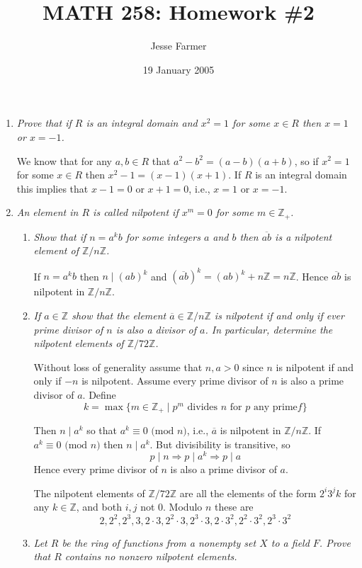 \documentclass[letterpaper, 11pt]{article}
\title{MATH 258: Homework \#2}
\author{Jesse Farmer}
\date{19 January 2005}
\newcommand{\Z}{\mathbb{Z}}
\begin{document}
\maketitle
\begin{enumerate}
\item \emph{Prove that if $R$ is an integral domain and $x^2 = 1$ for some $x \in R$ then $x=1$ or $x=-1$.}

We know that for any $a,b \in R$ that $a^2 - b^2 = (a-b)(a+b)$, so if $x^2 = 1$ for some $x \in R$ then $x^2 - 1 = (x-1)(x+1)$.  If $R$ is an integral domain this implies that $x-1 = 0$ or $x+1=0$, i.e., $x=1$ or $x = -1$.
 
\item \emph{An element in $R$ is called \emph{nilpotent} if $x^m = 0$ for some $m \in \Z_+$.}
\begin{enumerate}
\item \emph{Show that if $n=a^kb$ for some integers $a$ and $b$ then $\overline{ab}$ is a nilpotent element of $\Z/n\Z$.}

If $n=a^kb$ then $n \mid (ab)^k$ and $\left(\overline{ab}\right)^k = (ab)^k + n\Z = n\Z$.  Hence $\overline{ab}$ is nilpotent in $\Z/n\Z$.

\item \emph{If $a \in \Z$ show that the element $\overline{a} \in \Z/n\Z$ is nilpotent if and only if ever prime divisor of $n$ is also a divisor of $a$.  In particular, determine the nilpotent elements of $\Z/72\Z$.}

Without loss of generality assume that $n,a > 0$ since $n$ is nilpotent if and only if $-n$ is nilpotent.  Assume every prime divisor of $n$ is also a prime divisor of $a$.  Define
\[
k = \max\{m \in \Z_+ \mid p^m \mbox{ divides } n \mbox{ for $p$ any prime}f\} 
\]

Then $n \mid a^k$ so that $a^k \equiv 0 \mbox{ (mod $n$)}$, i.e., $\overline{a}$ is nilpotent in $\Z/n\Z$.  If $a^k \equiv 0 \mbox{ (mod $n$)}$ then $n \mid a^k$.  But divisibility is transitive, so $$p \mid n \Rightarrow p \mid a^k \Rightarrow p \mid a$$  Hence every prime divisor of $n$ is also a prime divisor of $a$.

The nilpotent elements of $\Z/72\Z$ are all the elements of the form $2^i3^jk$ for any $k \in \Z$, and both $i,j$ not $0$.  Modulo $n$ these are
\[
2, 2^2, 2^3, 3, 2\cdot3, 2^2\cdot3, 2^3 \cdot 3, 2 \cdot 3^2, 2^2 \cdot 3^2, 2^3 \cdot 3^2
\]

\item \emph{Let $R$ be the ring of functions from a nonempty set $X$ to a field $F$.  Prove that $R$ contains no nonzero nilpotent elements.}


\end{enumerate}
\end{enumerate}
\end{document}
